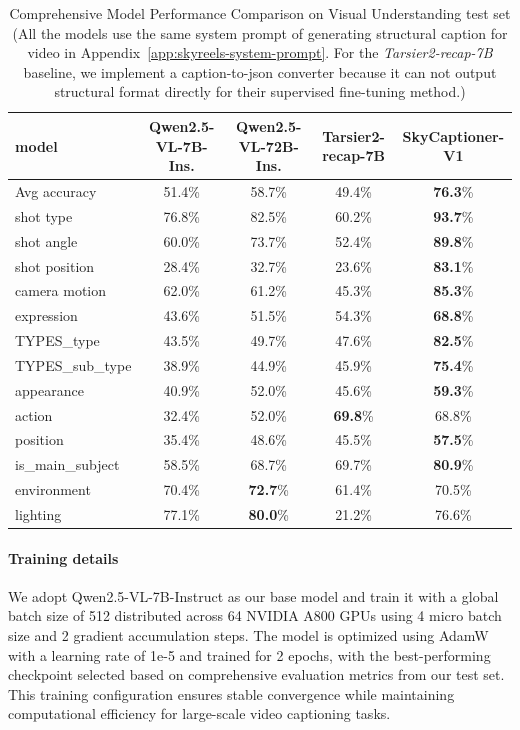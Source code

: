 \documentclass{article}
\begin{document}
{\begin{table}[htbp]
    \centering
\caption{Comprehensive Model Performance Comparison on Visual Understanding test set (All the models use the same system prompt of generating structural caption for video in Appendix~\ref{app:skyreels-system-prompt}. For the \textit{Tarsier2-recap-7B} baseline, we implement a caption-to-json converter because it can not output structural format directly for their supervised fine-tuning method.)}
    \label{tab:captioner_comparison}
\begin{tabular}{l|c|c|c|c}
\hline
model & Qwen2.5-VL-7B-Ins.& Qwen2.5-VL-72B-Ins.& Tarsier2-recap-7B& \textbf{SkyCaptioner-V1} \\
\hline
Avg accuracy & 51.4\% & 58.7\% & 49.4\% & \textbf{76.3}\% \\
\hline
shot type & 76.8\% & 82.5\% & 60.2\% & \textbf{93.7}\% \\
shot angle & 60.0\% & 73.7\% & 52.4\% & \textbf{89.8}\% \\
shot position & 28.4\% & 32.7\% & 23.6\% & \textbf{83.1}\% \\
camera motion & 62.0\% & 61.2\% & 45.3\% & \textbf{85.3}\% \\
expression & 43.6\% & 51.5\% & 54.3\% & \textbf{68.8}\% \\
\hline
TYPES\_type & 43.5\% & 49.7\% & 47.6\% & \textbf{82.5}\% \\
TYPES\_sub\_type & 38.9\% & 44.9\% & 45.9\% & \textbf{75.4}\% \\
appearance & 40.9\% & 52.0\% & 45.6\% & \textbf{59.3}\% \\
action & 32.4\% & 52.0\% & \textbf{69.8}\% & 68.8\% \\
position & 35.4\% & 48.6\% & 45.5\% & \textbf{57.5}\% \\
is\_main\_subject & 58.5\% & 68.7\% & 69.7\% & \textbf{80.9}\% \\
environment & 70.4\% & \textbf{72.7}\% & 61.4\% & 70.5\% \\
lighting & 77.1\% & \textbf{80.0}\% & 21.2\% & 76.6\% \\
\hline
\end{tabular}
\end{table} 

\paragraph{Training details} We adopt Qwen2.5-VL-7B-Instruct as our base model and train it with a global batch size of 512 distributed across 64 NVIDIA A800 GPUs using 4 micro batch size and 2 gradient accumulation steps. The model is optimized using AdamW with a learning rate of 1e-5 and trained for 2 epochs, with the best-performing checkpoint selected based on comprehensive evaluation metrics from our test set. This training configuration ensures stable convergence while maintaining computational efficiency for large-scale video captioning tasks.

}
\end{document}
